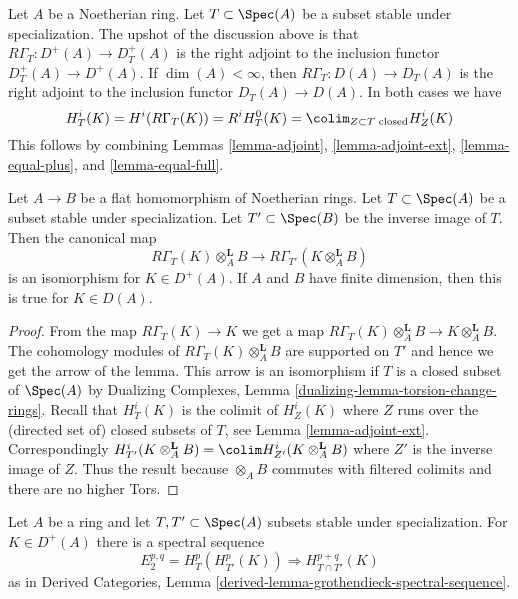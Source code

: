 \begin{remark}
\label{remark-upshot}
Let $A$ be a Noetherian ring. Let $T \subset \Spec(A)$ be a
subset stable under specialization.
The upshot of the discussion above is that
$R\Gamma_T : D^+(A) \to D_T^+(A)$ is the right adjoint
to the inclusion functor $D_T^+(A) \to D^+(A)$.
If $\dim(A) < \infty$, then
$R\Gamma_T : D(A) \to D_T(A)$ is the right adjoint
to the inclusion functor $D_T(A) \to D(A)$.
In both cases we have
$$
H^i_T(K) = H^i(R\Gamma_T(K)) = R^iH^0_T(K) =
\colim_{Z \subset T\text{ closed}} H^i_Z(K)
$$
This follows by combining
Lemmas \ref{lemma-adjoint}, \ref{lemma-adjoint-ext},
\ref{lemma-equal-plus}, and \ref{lemma-equal-full}.
\end{remark}

\begin{lemma}
\label{lemma-torsion-change-rings}
Let $A \to B$ be a flat homomorphism of Noetherian rings.
Let $T \subset \Spec(A)$ be a subset stable under specialization.
Let $T' \subset \Spec(B)$ be the inverse image of $T$.
Then the canonical map
$$
R\Gamma_T(K) \otimes_A^\mathbf{L} B
\longrightarrow
R\Gamma_{T'}(K \otimes_A^\mathbf{L} B)
$$
is an isomorphism for $K \in D^+(A)$. If $A$ and $B$ have finite
dimension, then this is true for $K \in D(A)$.
\end{lemma}

\begin{proof}
From the map $R\Gamma_T(K) \to K$ we get a map
$R\Gamma_T(K) \otimes_A^\mathbf{L} B \to K \otimes_A^\mathbf{L} B$.
The cohomology modules of $R\Gamma_T(K) \otimes_A^\mathbf{L} B$
are supported on $T'$ and hence we get the arrow of the lemma.
This arrow is an isomorphism if $T$ is a closed subset of $\Spec(A)$ by
Dualizing Complexes, Lemma \ref{dualizing-lemma-torsion-change-rings}.
Recall that $H^i_T(K)$ is the colimit of $H^i_Z(K)$ where $Z$ runs over
the (directed set of) closed subsets of $T$, see
Lemma \ref{lemma-adjoint-ext}.
Correspondingly
$H^i_{T'}(K \otimes_A^\mathbf{L} B) =
\colim H^i_{Z'}(K \otimes_A^\mathbf{L} B)$ where $Z'$ is the inverse
image of $Z$. Thus the result because $\otimes_A B$ commutes
with filtered colimits and there are no higher Tors.
\end{proof}

\begin{lemma}
\label{lemma-local-cohomology-ss}
Let $A$ be a ring and let $T, T' \subset \Spec(A)$ subsets
stable under specialization. For $K \in D^+(A)$
there is a spectral sequence
$$
E_2^{p, q} = H^p_T(H^p_{T'}(K)) \Rightarrow H^{p + q}_{T \cap T'}(K)
$$
as in Derived Categories, Lemma
\ref{derived-lemma-grothendieck-spectral-sequence}.
\end{lemma}

